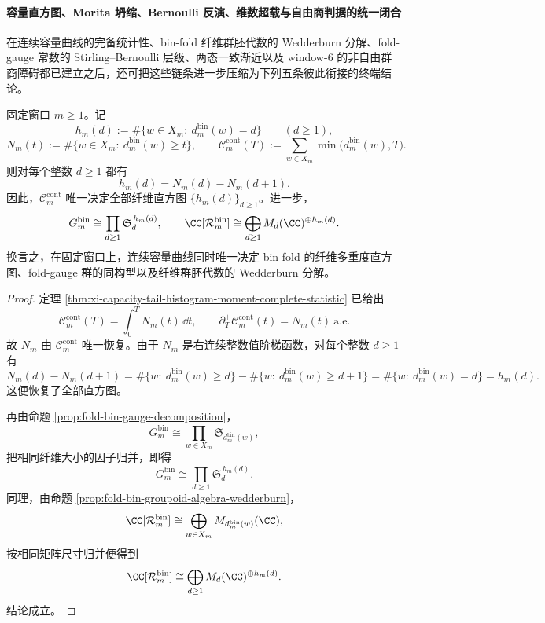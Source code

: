 \paragraph{容量直方图、Morita 坍缩、Bernoulli 反演、维数超载与自由商判据的统一闭合}
在连续容量曲线的完备统计性、bin-fold 纤维群胚代数的 Wedderburn 分解、fold-gauge 常数的 Stirling--Bernoulli 层级、两态一致渐近以及 window-\(6\) 的非自由群商障碍都已建立之后，还可把这些链条进一步压缩为下列五条彼此衔接的终端结论。

\begin{theorem}\label{thm:xi-time-part60acb-capacity-histogram-gauge-groupoid-complete}
固定窗口 \(m\ge 1\)。记
\[
h_m(d):=\#\{w\in X_m:\ d_m^{\mathrm{bin}}(w)=d\}
\qquad(d\ge 1),
\]
\[
N_m(t):=\#\{w\in X_m:\ d_m^{\mathrm{bin}}(w)\ge t\},
\qquad
\mathcal C_m^{\mathrm{cont}}(T):=\sum_{w\in X_m}\min\bigl(d_m^{\mathrm{bin}}(w),T\bigr).
\]
则对每个整数 \(d\ge 1\) 都有
\[
h_m(d)=N_m(d)-N_m(d+1).
\]
因此，\(\mathcal C_m^{\mathrm{cont}}\) 唯一决定全部纤维直方图 \(\{h_m(d)\}_{d\ge 1}\)。进一步，
\[
G_m^{\mathrm{bin}}
\cong
\prod_{d\ge 1}\mathfrak S_d^{\,h_m(d)},
\qquad
\CC[\mathcal R_m^{\mathrm{bin}}]
\cong
\bigoplus_{d\ge 1}M_d(\CC)^{\oplus h_m(d)}.
\]
换言之，在固定窗口上，连续容量曲线同时唯一决定 bin-fold 的纤维多重度直方图、fold-gauge 群的同构型以及纤维群胚代数的 Wedderburn 分解。
\end{theorem}
\begin{proof}
定理 \ref{thm:xi-capacity-tail-histogram-moment-complete-statistic} 已给出
\[
\mathcal C_m^{\mathrm{cont}}(T)=\int_0^T N_m(t)\,\dd t,
\qquad
\partial_T^+\mathcal C_m^{\mathrm{cont}}(t)=N_m(t)\ \text{a.e.}
\]
故 \(N_m\) 由 \(\mathcal C_m^{\mathrm{cont}}\) 唯一恢复。由于 \(N_m\) 是右连续整数值阶梯函数，对每个整数 \(d\ge 1\) 有
\[
N_m(d)-N_m(d+1)
=
\#\{w:\ d_m^{\mathrm{bin}}(w)\ge d\}
-\#\{w:\ d_m^{\mathrm{bin}}(w)\ge d+1\}
=
\#\{w:\ d_m^{\mathrm{bin}}(w)=d\}
=
h_m(d).
\]
这便恢复了全部直方图。

再由命题 \ref{prop:fold-bin-gauge-decomposition}，
\[
G_m^{\mathrm{bin}}
\cong
\prod_{w\in X_m}\mathfrak S_{d_m^{\mathrm{bin}}(w)},
\]
把相同纤维大小的因子归并，即得
\[
G_m^{\mathrm{bin}}
\cong
\prod_{d\ge 1}\mathfrak S_d^{\,h_m(d)}.
\]
同理，由命题 \ref{prop:fold-bin-groupoid-algebra-wedderburn}，
\[
\CC[\mathcal R_m^{\mathrm{bin}}]
\cong
\bigoplus_{w\in X_m}M_{d_m^{\mathrm{bin}}(w)}(\CC),
\]
按相同矩阵尺寸归并便得到
\[
\CC[\mathcal R_m^{\mathrm{bin}}]
\cong
\bigoplus_{d\ge 1}M_d(\CC)^{\oplus h_m(d)}.
\]
结论成立。
\end{proof}

